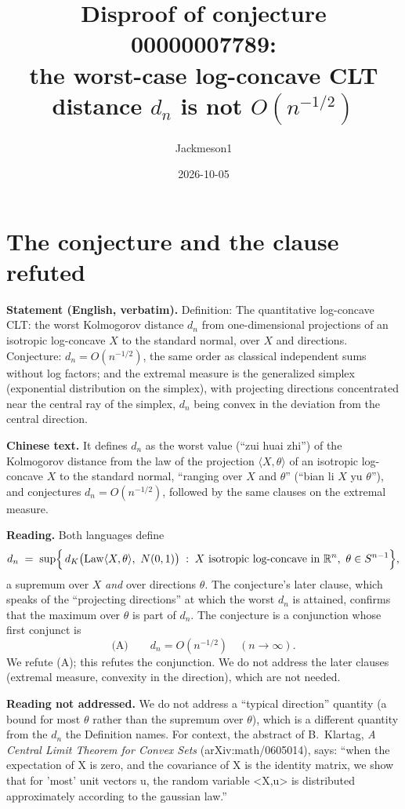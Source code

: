 \documentclass[11pt]{article}
\title{Disproof of conjecture 00000007789:\\ the worst-case log-concave CLT distance $d_n$ is not $O(n^{-1/2})$}
\author{Jackmeson1}
\date{2026-10-05}
\theoremstyle{definition}
\newcommand{\R}{\mathbb{R}}
\begin{document}
\maketitle

\section{The conjecture and the clause refuted}

\textbf{Statement (English, verbatim).} Definition: The quantitative log-concave CLT: the worst
Kolmogorov distance $d_n$ from one-dimensional projections of an isotropic log-concave $X$ to the
standard normal, over $X$ and directions. Conjecture: $d_n = O(n^{-1/2})$, the same order as
classical independent sums without log factors; and the extremal measure is the generalized
simplex (exponential distribution on the simplex), with projecting directions concentrated near
the central ray of the simplex, $d_n$ being convex in the deviation from the central direction.

\textbf{Chinese text.} It defines $d_n$ as the worst value (``zui huai zhi'') of the Kolmogorov
distance from the law of the projection $\langle X,\theta\rangle$ of an isotropic log-concave $X$
to the standard normal, ``ranging over $X$ and $\theta$'' (``bian li $X$ yu $\theta$''), and
conjectures $d_n=O(n^{-1/2})$, followed by the same clauses on the extremal measure.

\textbf{Reading.} Both languages define
\[
  d_n \;=\; \sup\Bigl\{\, d_K\bigl(\mathrm{Law}\langle X,\theta\rangle,\ N(0,1)\bigr) \;:\;
  X \text{ isotropic log-concave in } \R^n,\ \theta\in S^{n-1}\Bigr\},
\]
a supremum over $X$ \emph{and} over directions $\theta$. The conjecture's later clause, which
speaks of the ``projecting directions'' at which the worst $d_n$ is attained, confirms that the
maximum over $\theta$ is part of $d_n$. The conjecture is a conjunction whose first conjunct is
\[
  \text{(A)}\qquad d_n = O(n^{-1/2}) \quad (n\to\infty).
\]
We refute (A); this refutes the conjunction. We do not address the later clauses (extremal
measure, convexity in the direction), which are not needed.

\textbf{Reading not addressed.} We do not address a ``typical direction'' quantity (a bound
for most $\theta$ rather than the supremum over $\theta$), which is a different quantity from
the $d_n$ the Definition names. For context, the abstract of B.~Klartag, \emph{A Central Limit
Theorem for Convex Sets} (arXiv:math/0605014), says: ``when the expectation of X is zero, and the
covariance of X is the identity matrix, we show that for 'most' unit vectors u, the random
variable \textless X,u\textgreater{} is distributed approximately according to the gaussian law.''
\end{document}
